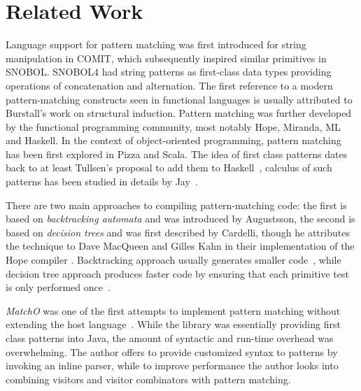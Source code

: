 \section{Related Work} %
\label{sec:rw}

Language support for pattern matching was first introduced for string manipulation 
in COMIT\cite{COMIT58}, which subsequently inspired similar primitives in 
SNOBOL\cite{SNOBOL64}. SNOBOL4 had string patterns as first-class data types 
providing operations of concatenation and alternation\cite{SNOBOL71}.
The first reference to a modern pattern-matching constructs seen in functional 
languages is usually attributed to Burstall's work on structural 
induction\cite{Burstall69provingproperties}. Pattern matching was further 
developed by the functional programming community, most notably 
Hope\cite{BMS80}, Miranda\cite{Miranda85}, ML\cite{ML90} and 
Haskell\cite{Haskell98Book}. In the context of object-oriented programming, 
pattern matching has been first explored in Pizza\cite{Odersky97pizzainto} and 
Scala\cite{Scala2nd,EmirThesis}. The idea of first class patterns dates back to 
at least Tullsen's proposal to add them to Haskell~\cite{Tullsen00}, calculus of 
such patterns has been studied in details by Jay~\cite{Jay09,PatCalc09}.

There are two main approaches to compiling pattern-matching code: the first is 
based on \emph{backtracking automata} and was introduced by Augustsson\cite{Augustsson85}, 
the second is based on \emph{decision trees} and was first described by 
Cardelli\cite{Cardelli84}, though he attributes the technique to Dave MacQueen 
and Gilles Kahn in their implementation of the Hope compiler \cite{BMS80}.
Backtracking approach usually generates smaller code~\cite{OPM01}, while decision tree 
approach produces faster code by ensuring that each primitive test is only 
performed once~\cite{Maranget08}. %

\emph{MatchO} was one of the first attempts to implement pattern matching without 
extending the host language~\cite{Visser06matchingobjects}. While the library 
was essentially providing first class patterns into Java, the amount of 
syntactic and run-time overhead was overwhelming. The author offers to provide 
customized syntax to patterns by invoking an inline parser, while to improve 
performance the author looks into combining visitors and visitor combinators 
with pattern matching. %

